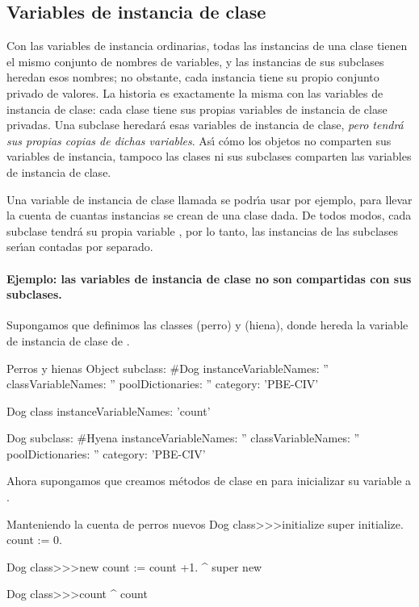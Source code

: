 \documentclass[a4paper,10pt,twoside]{book}
\begin{document}

\subsection{Variables de instancia de clase}

Con las variables de instancia ordinarias, todas las instancias de una clase tienen el mismo conjunto de nombres de variables, y las instancias de sus subclases heredan esos nombres; no obstante, cada instancia tiene su propio conjunto privado de valores.
La historia es exactamente la misma con las variables de instancia de clase: cada clase tiene sus propias variables de instancia de clase privadas. 
Una subclase heredar\'a esas variables de instancia de clase, \emph{pero tendr\'a sus propias copias de dichas variables}.
As\'\i{} c\'omo los objetos no comparten sus variables de instancia, tampoco las clases ni sus subclases comparten las variables de instancia de clase.

Una variable de instancia de clase llamada  se podr\'\i{}a usar por ejemplo, para llevar la cuenta de cuantas instancias se crean de una clase dada. De todos modos, cada subclase tendr\'a su propia variable , por lo tanto, las instancias de las subclases ser\'\i{}an contadas por separado. 

\paragraph{Ejemplo: las variables de instancia de clase no son compartidas con sus subclases.}
Supongamos que definimos las classes   (perro) y  (hiena), donde  hereda la variable de instancia de clase   de .

\begin{classdef}[dog]{Perros y hienas}
Object subclass: #Dog
	instanceVariableNames: ''
	classVariableNames: ''
	poolDictionaries: ''
	category: 'PBE-CIV'

Dog class
	instanceVariableNames: 'count'

Dog subclass: #Hyena
	instanceVariableNames: ''
	classVariableNames: ''
	poolDictionaries: ''
	category: 'PBE-CIV'
\end{classdef}

Ahora supongamos que creamos m\'etodos de clase en  para inicializar su variable  a .
\begin{method}[dogcount]{Manteniendo la cuenta de perros nuevos}
Dog class>>>initialize
	super initialize.
	count := 0.

Dog class>>>new
	count := count +1.
	^ super new

Dog class>>>count
	^ count
\end{method}
\end{document}
